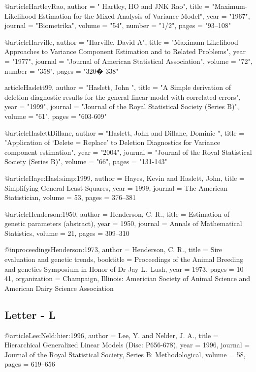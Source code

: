 @article{HartleyRao,
	author = " Hartley, HO and JNK Rao",
	title = "Maximum-Likelihood Estimation for the Mixed Analysis of Variance Model",
	year = "1967",
	journal = "Biometrika",
	volume = "54",
	number = "1/2",
	pages = "93--108"
}


@article{Harville,
	author = "Harville, David A",
	title = "Maximum Likelihood Approaches to Variance Component Estimation and to Related Problems",
	year = "1977",
	journal = "Journal of American Statistical Association",
	volume = "72",
	number = "358",
	pages = "320�-338"
}

article{Haslett99,
	author = "Haslett, John ",
	title = "A Simple derivation of deletion diagnostic results for the general linear model with correlated errors",
	year = "1999",
	journal = "Journal of the Royal Statistical Society (Series B)",
	volume = "61",
	pages = "603-609"
}

@article{HaslettDillane,
	author = "Haslett, John and Dillane, Dominic ",
	title = "Application of `Delete = Replace' to Deletion Diagnostics for Variance component estimation",
	year = "2004",
	journal = "Journal of the Royal Statistical Society (Series B)",
	volume = "66",
	pages = "131-143"
}

@article{Haye:Hasl:simp:1999,
	author = {Hayes, Kevin and Haslett, John},
	title = {Simplifying General Least Squares},
	year = {1999},
	journal = {The American Statistician},
	volume = {53},
	pages = {376--381}
}

@article{Henderson:1950,
	author = {Henderson, C. R.},
	title = {Estimation of genetic parameters (abstract)},
	year = {1950},
	journal = {Annals of Mathematical Statistics},
	volume = {21},
	pages = {309--310}
}

@inproceedings{Henderson:1973,
	author =      {Henderson, C. R.},
	title =        {Sire evaluation and genetic trends},
	booktitle =    {Proceedings of the Animal Breeding and genetics Symposium in Honor of Dr Jay L.\ Lush},
	year =         {1973},
	pages =        {10--41},
	organization = {Champaign, Illinois: Americian Society of Animal Science and American Dairy Science Association}
}

\subsection{Letter - L }

@article{Lee:Neld:hier:1996,
	author = {Lee, Y. and Nelder, J. A.},
	title = {Hierarchical Generalized Linear Models ({D}isc: P656-678)},
	year = {1996},
	journal = {Journal of the Royal Statistical Society, Series B: Methodological},
	volume = {58},
	pages = {619--656}
}


